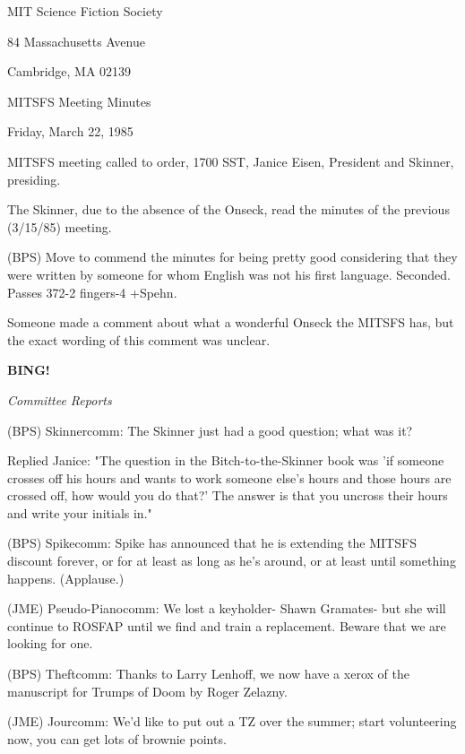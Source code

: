 \documentclass[12pt]{article}
\newcommand{\bing}{{\bf BING!} }
\newcommand{\goto}[1]{\bing \vskip 12pt \centerline{{\em{#1}}}}
\begin{document}
\begin{center}

MIT Science Fiction Society 

84 Massachusetts Avenue

Cambridge, MA 02139

\vspace{12pt}

MITSFS Meeting Minutes 

Friday, March 22, 1985

\end{center}
 
\vspace{18pt}

\setlength{\parskip}{6pt}

\noindent
MITSFS meeting called to order, 1700 SST,
Janice Eisen, President and Skinner, presiding.

The Skinner, due to the absence of the Onseck, read the minutes of the previous (3/15/85) meeting.

(BPS) Move to commend the minutes for being pretty good considering that they were written by someone for whom English was not his first language. Seconded. Passes 372-2 fingers-4 +Spehn.

Someone made a comment about what a wonderful Onseck the MITSFS has, but the exact wording of this comment was unclear.

\goto{Committee Reports}

(BPS) Skinnercomm: The Skinner just had a good question; what was it?

Replied Janice: "The question in the Bitch-to-the-Skinner book was 'if someone crosses off his hours and wants to work someone else's hours and those hours are crossed off, how would you do that?' The answer is that you uncross their hours and write your initials in."

(BPS) Spikecomm: Spike has announced that he is extending the MITSFS discount forever, or for at least as long as he's around, or at least until something happens. (Applause.)

(JME) Pseudo-Pianocomm: We lost a keyholder- Shawn Gramates- but she will continue to ROSFAP until we find and train a replacement. Beware that we are looking for one.

(BPS) Theftcomm: Thanks to Larry Lenhoff, we now have a xerox of the manuscript for Trumps of Doom by Roger Zelazny.

(JME) Jourcomm: We'd like to put out a TZ over the summer; start volunteering now, you can get lots of brownie points.
\end{document}
